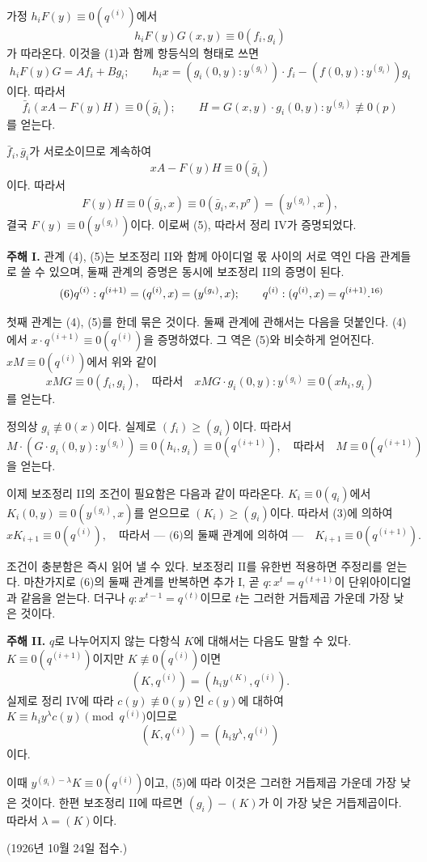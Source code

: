 가정 \(h_iF(y)\equiv0(q^{(i)})\)에서
\[
h_iF(y)G(x,y)\equiv0(f_i,g_i)
\]
가 따라온다. 이것을 (1)과 함께 항등식의 형태로 쓰면
\[
h_iF(y)G=A f_i+B g_i;\qquad
h_ix=(g_i(0,y):y^{(g_i)})\cdot f_i-(f(0,y):y^{(g_i)})g_i
\]
이다. 따라서
\[
\bar f_i(xA-F(y)H)\equiv0(\bar g_i);\qquad
H=G(x,y)\cdot g_i(0,y):y^{(g_i)}\not\equiv0(p)
\]
를 얻는다.

\(\bar f_i,\bar g_i\)가 서로소이므로 계속하여
\[
xA-F(y)H\equiv0(\bar g_i)
\]
이다. 따라서
\[
F(y)H\equiv0(\bar g_i,x)\equiv0(\bar g_i,x,p^\sigma)=(y^{(g_i)},x),
\]
결국 \(F(y)\equiv0(y^{(g_i)})\)이다. 이로써 (5), 따라서 정리 IV가 증명되었다.

\textbf{주해 I.} 관계 (4), (5)는 보조정리 II와 함께 아이디얼 몫 사이의 서로 역인 다음 관계들로 쓸 수 있으며, 둘째 관계의 증명은 동시에 보조정리 II의 증명이 된다.
\begin{equation}
\tag{6}
q^{(i)}:q^{(i+1)}=(q^{(i)},x)=(y^{(g_i)},x);\qquad
q^{(i)}:(q^{(i)},x)=q^{(i+1)}.\srcfnmark{16)}
\end{equation}

첫째 관계는 (4), (5)를 한데 묶은 것이다. 둘째 관계에 관해서는 다음을 덧붙인다. (4)에서 \(x\cdot q^{(i+1)}\equiv0(q^{(i)})\)을 증명하였다. 그 역은 (5)와 비슷하게 얻어진다. \(xM\equiv0(q^{(i)})\)에서 위와 같이
\[
xMG\equiv0(f_i,g_i),\quad\text{따라서}\quad
xMG\cdot g_i(0,y):y^{(g_i)}\equiv0(xh_i,g_i)
\]
를 얻는다.

정의상 \(g_i\not\equiv0(x)\)이다. 실제로 \((f_i)\geq(g_i)\)이다. 따라서
\[
M\cdot(G\cdot g_i(0,y):y^{(g_i)})\equiv0(h_i,g_i)\equiv0(q^{(i+1)}),
\quad\text{따라서}\quad M\equiv0(q^{(i+1)})
\]
을 얻는다.

이제 보조정리 II의 조건이 필요함은 다음과 같이 따라온다. \(K_i\equiv0(q_i)\)에서 \(K_i(0,y)\equiv0(y^{(g_i)},x)\)를 얻으므로 \((K_i)\geq(g_i)\)이다. 따라서 (3)에 의하여
\[
xK_{i+1}\equiv0(q^{(i)}),\quad
\text{따라서 --- (6)의 둘째 관계에 의하여 ---}\quad
K_{i+1}\equiv0(q^{(i+1)}).
\]

조건이 충분함은 즉시 읽어 낼 수 있다. 보조정리 II를 유한번 적용하면 주정리를 얻는다. 마찬가지로 (6)의 둘째 관계를 반복하면 추가 I, 곧 \(q:x^t=q^{(t+1)}\)이 단위아이디얼과 같음을 얻는다. 더구나 \(q:x^{t-1}=q^{(t)}\)이므로 \(t\)는 그러한 거듭제곱 가운데 가장 낮은 것이다.

\textbf{주해 II.} \(q\)로 나누어지지 않는 다항식 \(K\)에 대해서는 다음도 말할 수 있다. \(K\equiv0(q^{(i+1)})\)이지만 \(K\not\equiv0(q^{(i)})\)이면
\[
(K,q^{(i)})=(h_iy^{(K)},q^{(i)}).
\]
실제로 정리 IV에 따라 \(c(y)\not\equiv0(y)\)인 \(c(y)\)에 대하여 \(K\equiv h_iy^\lambda c(y)\pmod{q^{(i)}}\)이므로
\[
(K,q^{(i)})=(h_iy^\lambda,q^{(i)})
\]
이다.

이때 \(y^{(g_i)-\lambda}K\equiv0(q^{(i)})\)이고, (5)에 따라 이것은 그러한 거듭제곱 가운데 가장 낮은 것이다. 한편 보조정리 II에 따르면 \((g_i)-(K)\)가 이 가장 낮은 거듭제곱이다. 따라서 \(\lambda=(K)\)이다.

\begin{center}
(1926년 10월 24일 접수.)
\end{center}
